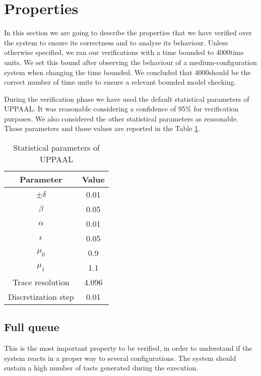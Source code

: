 \newcommand{\timebound}{4000}
\newcommand{\query}{[INSERIRE LA QUERY]}

\section{Properties}
In this section we are going to describe the properties that we have verified over the system to ensure its correctness and to analyse its behaviour. Unless otherwise specified, we ran our verifications with a time bounded to \timebound \space time units. We set this bound after observing the behaviour of a medium-configuration system when changing the time bounded. We concluded that \timebound \space should be the correct number of time units to ensure a relevant bounded model checking.

During the verification phase we have used the default statistical parameters of UPPAAL. It was reasonable considering a confidence of 95\% for verification purposes. We also considered the other statistical parameters as reasonable. Those parameters and those values are reported in the Table \ref{tab:statparam}.

\begin{table}[h]
    \centering
        \begin{tabular}{|c c|} 
            \hline
            Parameter & Value \\ [0.5ex] 
            \hline\hline
            $\pm\delta$ & 0.01 \\
            $\beta$ & 0.05 \\
            $\alpha$ & 0.01 \\
            $\epsilon$ & 0.05 \\
            $\mu_0$ & 0.9 \\
            $\mu_1$ & 1.1 \\
            Trace resolution & 4.096 \\
            Discretization step & 0.01 \\ [0.5ex] 
            \hline
        \end{tabular}
        \caption{Statistical parameters of UPPAAL}
        \label{tab:statparam}
\end{table}

\subsection{Full queue}
This is the most important property to be verified, in order to understand if the system reacts in a proper way to several configurations. The system should sustain a high number of tasts generated during the execution.

